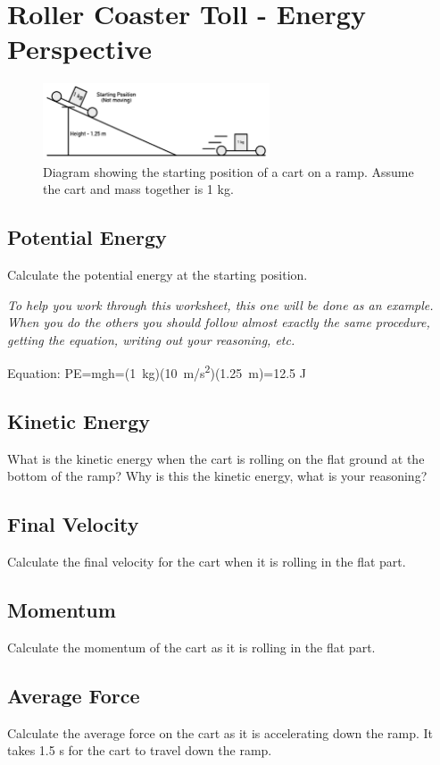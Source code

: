 \documentclass[12pt, fleqn, paper=letter, oneside]{scrartcl}
\begin{document}
\section{Roller Coaster Toll - Energy Perspective}
\begin{figure}[h]
\centering
\includegraphics[width=0.6\textwidth]{energycoaster}
\caption{Diagram showing the starting position of a cart on a ramp.  Assume the cart and mass together is 1 kg.}
\end{figure}

\subsection{Potential Energy}
Calculate the potential energy at the starting position.

\emph{To help you work through this worksheet, this one will be done as an example.  When you do the others you should follow almost exactly the same procedure, getting the equation, writing out your reasoning, etc.}

Equation: PE=mgh=(\SI{1}{kg})(\SI{10}{m/s^2})(\SI{1.25}{m})=12.5 J

\subsection{Kinetic Energy}
What is the kinetic energy when the cart is rolling on the flat ground at the bottom of the ramp?
Why is this the kinetic energy, what is your reasoning?

\vfill
\subsection{Final Velocity}
Calculate the final velocity for the cart when it is rolling in the flat part.

\vfill
\subsection{Momentum}
Calculate the momentum of the cart as it is rolling in the flat part.

\vfill
\subsection{Average Force}
Calculate the average force on the cart as it is accelerating down the ramp.  It takes 1.5 s for the cart to travel down the ramp.
\vfill
\end{document}
